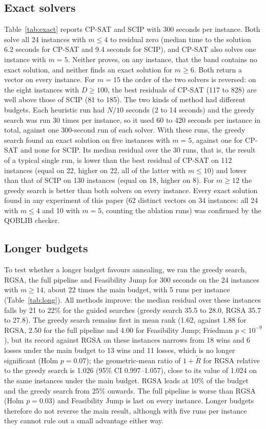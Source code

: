 \documentclass[pdflatex,sn-mathphys-num]{sn-jnl}
\theoremstyle{thmstyleone}
\theoremstyle{thmstylethree}
\begin{document}
\subsection{Exact solvers}\label{sec:res-exact}
Table~\ref{tab:exact} reports CP-SAT and SCIP with 300 seconds per instance. Both solve all 24 instances with $m\le4$ to residual zero (median time to the solution 6.2 seconds for CP-SAT and 9.4 seconds for SCIP), and CP-SAT also solves one instance with $m=5$. Neither proves, on any instance, that the band contains no exact solution, and neither finds an exact solution for $m\ge6$. Both return a vector on every instance. For $m=15$ the order of the two solvers is reversed: on the eight instances with $D\ge100$, the best residuals of CP-SAT (117 to 828) are well above those of SCIP (81 to 185). The two kinds of method had different budgets. Each heuristic run had $N/10$ seconds (2 to 14 seconds) and the greedy search was run 30 times per instance, so it used 60 to 420 seconds per instance in total, against one 300-second run of each solver. With these runs, the greedy search found an exact solution on five instances with $m=5$, against one for CP-SAT and none for SCIP. Its median residual over the 30 runs, that is, the result of a typical single run, is lower than the best residual of CP-SAT on 112 instances (equal on 22, higher on 22, all of the latter with $m\le10$) and lower than that of SCIP on 130 instances (equal on 18, higher on 8). For $m\ge12$ the greedy search is better than both solvers on every instance. Every exact solution found in any experiment of this paper (62 distinct vectors on 34 instances: all 24 with $m\le4$ and 10 with $m=5$, counting the ablation runs) was confirmed by the QOBLIB checker.



\subsection{Longer budgets}\label{sec:res-long}
To test whether a longer budget favours annealing, we ran the greedy search, RGSA, the full pipeline and Feasibility Jump for 300 seconds on the 24 instances with $m\ge14$, about 22 times the main budget, with 5 runs per instance (Table~\ref{tab:long}). All methods improve: the median residual over these instances falls by 21 to 22\% for the guided searches (greedy search 35.5 to 28.0, RGSA 35.7 to 27.8). The greedy search remains first in mean rank (1.62, against 1.88 for RGSA, 2.50 for the full pipeline and 4.00 for Feasibility Jump; Friedman $p<10^{-9}$), but its record against RGSA on these instances narrows from 18 wins and 6 losses under the main budget to 13 wins and 11 losses, which is no longer significant (Holm $p=0.07$); the geometric-mean ratio of $1+\tilde R$ for RGSA relative to the greedy search is 1.026 (95\% CI 0.997--1.057), close to its value of 1.024 on the same instances under the main budget. RGSA leads at 10\% of the budget and the greedy search from 25\% onwards. The full pipeline is worse than RGSA (Holm $p=0.03$) and Feasibility Jump is last on every instance. Longer budgets therefore do not reverse the main result, although with five runs per instance they cannot rule out a small advantage either way.
\end{document}
